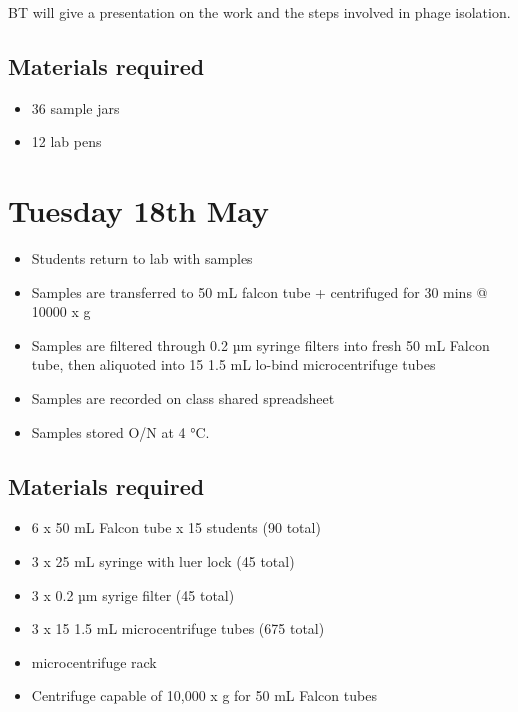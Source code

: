 \documentclass[
]{book}
\providecommand{\tightlist}{%
  \setlength{\itemsep}{0pt}\setlength{\parskip}{0pt}}
\begin{document}
BT will give a presentation on the work and the steps involved in phage isolation.

\hypertarget{materials-required}{%
\subsection{Materials required}\label{materials-required}}

\begin{itemize}
\tightlist
\item
  36 sample jars
\item
  12 lab pens
\end{itemize}

\hypertarget{tuesday-18th-may}{%
\section{Tuesday 18th May}\label{tuesday-18th-may}}

\begin{itemize}
\tightlist
\item
  Students return to lab with samples
\item
  Samples are transferred to 50 mL falcon tube + centrifuged for 30 mins @ 10000 x g
\item
  Samples are filtered through 0.2 µm syringe filters into fresh 50 mL Falcon tube, then aliquoted into 15 1.5 mL lo-bind microcentrifuge tubes
\item
  Samples are recorded on class shared spreadsheet
\item
  Samples stored O/N at 4 °C.
\end{itemize}

\hypertarget{materials-required-1}{%
\subsection{Materials required}\label{materials-required-1}}

\begin{itemize}
\tightlist
\item
  6 x 50 mL Falcon tube x 15 students (90 total)
\item
  3 x 25 mL syringe with luer lock (45 total)
\item
  3 x 0.2 µm syrige filter (45 total)
\item
  3 x 15 1.5 mL microcentrifuge tubes (675 total)
\item
  microcentrifuge rack
\item
  Centrifuge capable of 10,000 x g for 50 mL Falcon tubes
\end{itemize}
\end{document}
